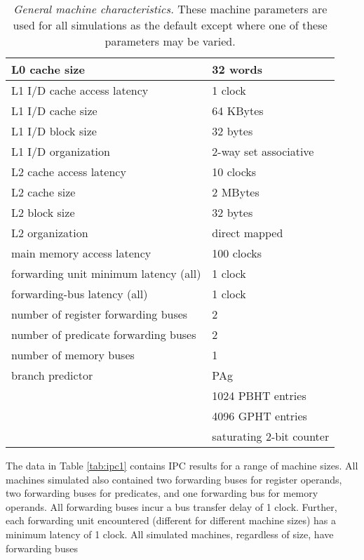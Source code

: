 \documentclass[10pt,dvips]{article}
\begin{document}
\begin{table}
\begin{center}
\caption{{\em General machine characteristics.}
These machine parameters are used for all simulations as
the default except where one of these parameters may be varied.}
\label{tab:params}
\vspace{+0.1in}
\begin{tabular}{|l|l|}
\hline 
L0 cache size&32 words\\
\hline 
L1 I/D cache access latency&1 clock\\
\hline
L1 I/D cache size&64 KBytes\\
\hline
L1 I/D block size&32 bytes\\
\hline
L1 I/D organization&2-way set associative\\
\hline
L2 cache access latency&10 clocks\\
\hline
L2 cache size&2 MBytes\\
\hline
L2 block size&32 bytes\\
\hline
L2 organization&direct mapped\\
\hline
main memory access latency&100 clocks\\
\hline
forwarding unit minimum latency (all)&1 clock\\
\hline
forwarding-bus latency (all)&1 clock\\
\hline
number of register forwarding buses&2\\
\hline
number of predicate forwarding buses&2\\
\hline
number of memory buses&1\\
\hline
branch predictor&PAg\\
\cline{2-2}
 & 1024 PBHT entries\\
\cline{2-2}
 & 4096 GPHT entries\\
\cline{2-2}
 & saturating 2-bit counter\\
\hline
\end{tabular}
\end{center}
\end{table}
%
The data in Table \ref{tab:ipc1} contains IPC 
results for a range of machine sizes.
All machines simulated also contained two forwarding buses for
register operands, two forwarding buses for predicates, and
one forwarding bus for memory operands.
All forwarding buses incur a bus transfer delay of 1 clock.
Further, each forwarding unit encountered (different for different
machine sizes) has a minimum latency of 1 clock.
All simulated machines, regardless of size, have forwarding buses
\end{document}
